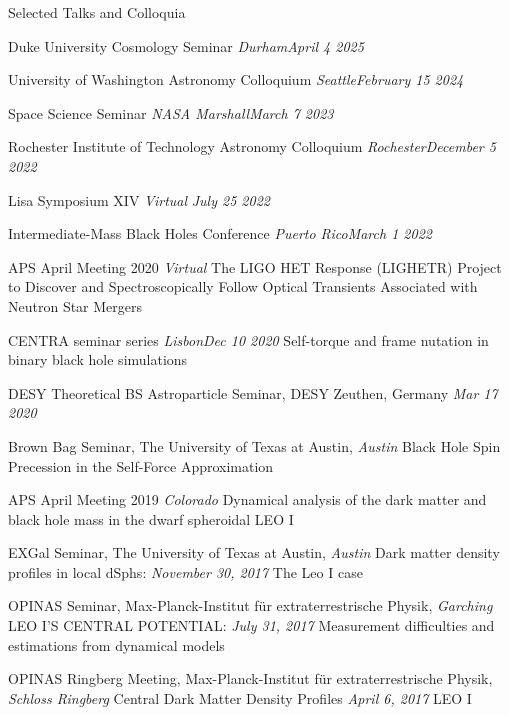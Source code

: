 \documentclass{resume}
\begin{document}
\begin{rSection}{Selected Talks and Colloquia}
\item  Duke University Cosmology Seminar
 \textit{Durham}\hfill{\em April 4 2025}
\item University of Washington Astronomy Colloquium
\textit{Seattle}\hfill{\em February 15 2024}
\item Space Science Seminar
\textit{NASA Marshall}\hfill{\em March 7 2023}
\item Rochester Institute of Technology Astronomy Colloquium
\textit{Rochester}\hfill{\em December 5 2022}
\item Lisa Symposium XIV \textit{Virtual} \hfill{\em July 25 2022}
\item Intermediate-Mass Black Holes Conference \textit{Puerto Rico}\hfill{\em March 1 2022}
\item APS April Meeting 2020 \textit{Virtual}
\subitem The LIGO HET Response (LIGHETR) Project to Discover and Spectroscopically Follow Optical Transients Associated with Neutron Star Mergers
\item CENTRA seminar series \textit{Lisbon}\hfill{\em Dec 10 2020}
\subitem 
Self-torque and frame nutation in binary black hole simulations
\item DESY Theoretical BS Astroparticle Seminar, DESY Zeuthen, Germany \hfill{\em Mar 17 2020}
\item Brown Bag Seminar, The University of Texas at Austin, \textit{Austin}
\subitem Black Hole Spin Precession in the Self-Force Approximation
\item APS April Meeting 2019 \textit{Colorado}
\subitem Dynamical analysis of the dark matter and black hole mass in the dwarf spheroidal LEO I
\item EXGal Seminar, The University of Texas at Austin, \textit{Austin}
\subitem Dark matter density profiles in local dSphs: \hfill{\em November 30, 2017}
\subitem The Leo I case
\item OPINAS Seminar, Max-Planck-Institut f\"ur extraterrestrische Physik, \textit{Garching}
\subitem LEO I'S CENTRAL POTENTIAL: \hfill{\em July 31, 2017}
\subitem Measurement difficulties and estimations from dynamical models
\item OPINAS Ringberg Meeting, Max-Planck-Institut f\"ur extraterrestrische Physik, \textit{Schloss Ringberg}
\subitem Central Dark Matter Density Profiles \hfill{\em April 6, 2017}
\subitem LEO I
\end{rSection}
\end{document}
